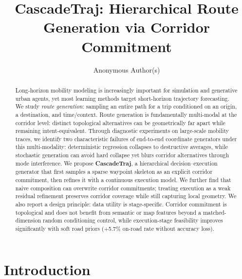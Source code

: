\documentclass{article}
\title{CascadeTraj: Hierarchical Route Generation via Corridor Commitment}
\author{Anonymous Author(s)}
\date{}
\newif\ificml
\begin{document}
\ificml
\twocolumn[
\icmltitle{CascadeTraj: Hierarchical Route Generation via Corridor Commitment}

\begin{icmlauthorlist}
\icmlauthor{Anonymous Author(s)}{anon}
\end{icmlauthorlist}

\icmlaffiliation{anon}{Anonymous Institution}
\icmlkeywords{route generation, route choice, diffusion models, hierarchical generative modeling}
\vskip 0.3in
]
\printAffiliationsAndNotice{} %
\else
\maketitle
\fi

\begin{abstract}
Long-horizon mobility modeling is increasingly important for simulation and generative urban agents, yet most learning methods target short-horizon trajectory forecasting.
We study \emph{route generation}: sampling an entire path for a trip conditioned on an origin, a destination, and time/context.
Route generation is fundamentally multi-modal at the corridor level: distinct topological alternatives can be geometrically far apart while remaining intent-equivalent.
Through diagnostic experiments on large-scale mobility traces, we identify two characteristic failures of end-to-end coordinate generators under this multi-modality: deterministic regression collapses to destructive averages, while stochastic generation can avoid hard collapse yet blurs corridor alternatives through mode interference.
We propose \textbf{CascadeTraj}, a hierarchical decision--execution generator that first samples a sparse waypoint skeleton as an explicit corridor commitment, then refines it with a continuous execution model.
We further find that naive composition can overwrite corridor commitments; treating execution as a weak residual refinement preserves corridor coverage while still capturing local geometry.
We also report a design principle: data utility is stage-specific.
Corridor commitment is topological and does not benefit from semantic or map features beyond a matched-dimension random conditioning control, while execution-stage feasibility improves significantly with soft road priors (+5.7\% on-road rate without accuracy loss).
\end{abstract}

\section{Introduction}

\end{document}
